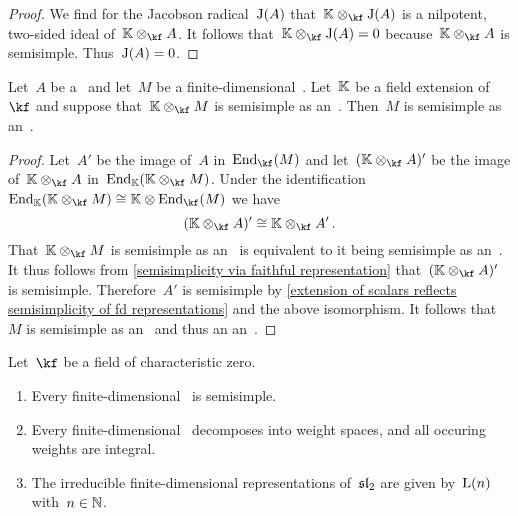\documentclass[a4paper, 11pt, oneside]{scrartcl}
\begin{document}
\begin{proof}
  We find for the Jacobson radical~$\operatorname{J}(A)$ that~$\Kf \tensor_{\kf} \Jac(A)$ is a nilpotent, two-sided ideal of~$\Kf \tensor_{\kf} A$.
  It follows that~$\Kf \tensor_{\kf} \Jac(A) = 0$ because~$\Kf \tensor_{\kf} A$ is semisimple.
  Thus~$\operatorname{J}(A) = 0$.
\end{proof}

\begin{corollary}
  \label{extension of scalars reflects semisimplicity of fd representations}
  Let~$A$ be a~\algebra{$\kf$} and let~$M$ be a finite-dimensional~.
  Let~$\mathbb{K}$ be a field extension of~$\kf$ and suppose that~$\Kf \tensor_{\kf} M$ is semisimple as an~.
  Then~$M$ is semisimple as an~.
\end{corollary}

\begin{proof}
  Let~$A'$ be the image of~$A$ in~$\End_{\kf}(M)$ and let~$(\Kf \tensor_{\kf} A)'$ be the image of~$\Kf \tensor_{\kf} A$ in~$\End_{\Kf}(\Kf \tensor_{\kf} M)$.
  Under the identification~$\End_{\Kf}(\Kf \tensor_{\kf} M) \cong \Kf \tensor \End_{\kf}(M)$ we have
  \[
    (\Kf \tensor_{\kf} A)'
    \cong
    \Kf \tensor_{\kf} A' \,.
  \]
  That~$\Kf \tensor_{\kf} M$ is semisimple as an~ is equivalent to it being semisimple as an~.
  It thus follows from \cref{semisimplicity via faithful representation} that~$(\Kf \tensor_{\kf} A)'$ is semisimple.
  Therefore~$A'$ is semisimple by \cref{extension of scalars reflects semisimplicity of fd representations} and the above isomorphism.
  It follows that~$M$ is semisimple as an~ and thus an an~.
\end{proof}


\begin{theorem}
  Let~$\kf$ be a field of characteristic zero.
  \begin{enumerate}
    \item
      Every finite-dimensional~ is semisimple.
    \item
      Every finite-dimensional~ decomposes into weight spaces, and all occuring weights are integral.
    \item
      The irreducible finite-dimensional representations of~$\mathfrak{sl}_2$ are given by~$\operatorname{L}(n)$ with~$n \in \mathbb{N}$.
  \end{enumerate}
\end{theorem}
\end{document}
